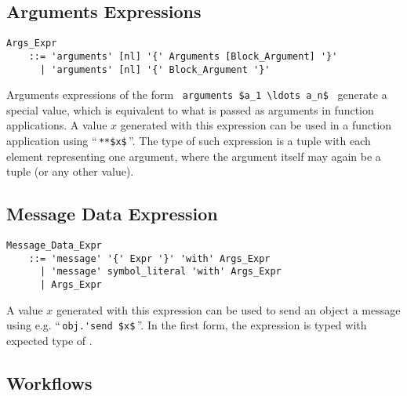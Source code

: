 \subsection{Arguments Expressions}
\label{sec:arguments-expressions}

\grammar\begin{lstlisting}
Args_Expr 
    ::= 'arguments' [nl] '{' Arguments [Block_Argument] '}' 
      | 'arguments' [nl] '{' Block_Argument '}'
\end{lstlisting}

Arguments expressions of the form ~\lstinline!arguments $a_1 \ldots a_n$!~ generate a special value, which is equivalent to what is passed as arguments in function applications. A value $x$ generated with this expression can be used in a function application using ``\,\lstinline!**$x$!\,''. The type of such expression is a tuple with each element representing one argument, where the argument itself may again be a tuple (or any other value). 





\subsection{Message Data Expression}
\label{sec:message-data-expression}

\grammar\begin{lstlisting}
Message_Data_Expr
    ::= 'message' '{' Expr '}' 'with' Args_Expr
      | 'message' symbol_literal 'with' Args_Expr
      | Args_Expr
\end{lstlisting}

A value $x$ generated with this expression can be used to send an object a message using e.g. ``\,\lstinline!obj.'send $x$!\,''. In the first form, the expression is typed with expected type of . 





\subsection{Workflows}
\label{sec:workflows}

